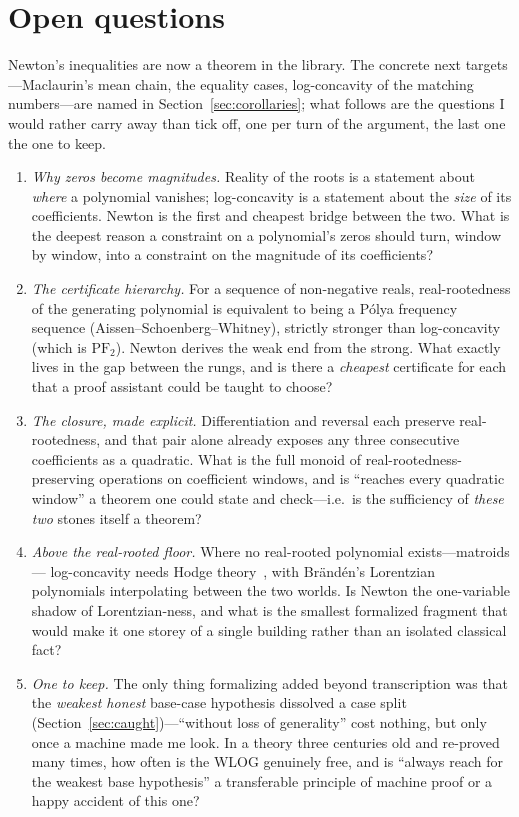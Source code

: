 \documentclass[11pt]{article}
\begin{document}
\section{Open questions}\label{sec:questions}

Newton's inequalities are now a theorem in the library. The concrete next targets---Maclaurin's
mean chain, the equality cases, log-concavity of the matching numbers---are named in
Section~\ref{sec:corollaries}; what follows are the questions I would rather carry away than tick
off, one per turn of the argument, the last one the one to keep.

\begin{enumerate}
\item \emph{Why zeros become magnitudes.} Reality of the roots is a statement about \emph{where} a
polynomial vanishes; log-concavity is a statement about the \emph{size} of its coefficients. Newton
is the first and cheapest bridge between the two. What is the deepest reason a constraint on a
polynomial's zeros should turn, window by window, into a constraint on the magnitude of its
coefficients?
\item \emph{The certificate hierarchy.} For a sequence of non-negative reals, real-rootedness of the
generating polynomial is equivalent to being a P\'olya frequency sequence
(Aissen--Schoenberg--Whitney), strictly stronger than log-concavity (which is $\mathrm{PF}_2$).
Newton derives the weak end from the strong. What exactly lives in the gap between the rungs, and is
there a \emph{cheapest} certificate for each that a proof assistant could be taught to choose?
\item \emph{The closure, made explicit.} Differentiation and reversal each preserve
real-rootedness, and that pair alone already exposes any three consecutive coefficients as a
quadratic. What is the full monoid of real-rootedness-preserving operations on coefficient windows,
and is ``reaches every quadratic window'' a theorem one could state and check---i.e.\ is the
sufficiency of \emph{these two} stones itself a theorem?
\item \emph{Above the real-rooted floor.} Where no real-rooted polynomial exists---matroids---%
log-concavity needs Hodge theory~\cite{AHK2018}, with Br\"and\'en's Lorentzian polynomials
interpolating between the two worlds. Is Newton the one-variable shadow of Lorentzian-ness, and what
is the smallest formalized fragment that would make it one storey of a single building rather than an
isolated classical fact?
\item \emph{One to keep.} The only thing formalizing added beyond transcription was that the
\emph{weakest honest} base-case hypothesis dissolved a case split
(Section~\ref{sec:caught})---``without loss of generality'' cost nothing, but only once a machine
made me look. In a theory three centuries old and re-proved many times, how often is the WLOG
genuinely free, and is ``always reach for the weakest base hypothesis'' a transferable principle of
machine proof or a happy accident of this one?
\end{enumerate}
\end{document}
